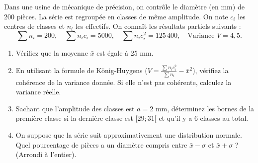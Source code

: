 \documentclass[11pt]{article}
\begin{document}
\begin{exercice}
Dans une usine de mécanique de précision, on contrôle le diamètre (en mm) de 200 pièces. La série est regroupée en classes de même amplitude. On note $c_i$ les centres de classes et $n_i$ les effectifs.
On connaît les résultats partiels suivants :
\[
\sum n_i = 200, \quad \sum n_i c_i = 5000, \quad \sum n_i c_i^2 = 125\,400, \quad \text{Variance } V = 4,5.
\]

\begin{enumerate}
    \item Vérifiez que la moyenne $\bar{x}$ est égale à 25 mm.
    \item En utilisant la formule de König-Huygens ($V = \frac{\sum n_i c_i^2}{\sum n_i} - \bar{x}^2$), vérifiez la cohérence de la variance donnée. Si elle n'est pas cohérente, calculez la variance réelle.
    \item Sachant que l'amplitude des classes est $a = 2$ mm, déterminez les bornes de la première classe si la dernière classe est $[29;31[$ et qu'il y a 6 classes au total.
    \item On suppose que la série suit approximativement une distribution normale. Quel pourcentage de pièces a un diamètre compris entre $\bar{x} - \sigma$ et $\bar{x} + \sigma$ ? (Arrondi à l'entier).
\end{enumerate}
\end{exercice}
\end{document}
